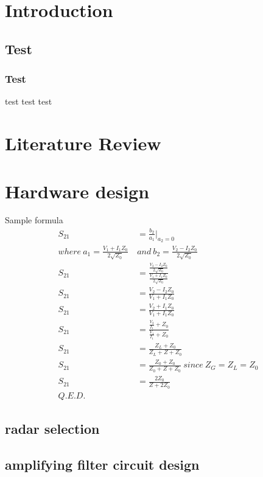 \thispagestyle{empty}
\newpage

\tableofcontents{\protect\thispagestyle{empty}}
\pagestyle{fancy}
\clearpage
\setcounter{page}{1}
\newpage



\section{Introduction}


\subsection{Test}
\subsubsection{Test}
test \textcite{dirac} test
test


\section{Literature Review}


\section{Hardware design}
Sample formula
\begin{align}
    S_{21}&=\frac{b_2}{a_1}|_{a_2=0}\\
    where\ a_1=\frac{V_1+I_1Z_0}{2\sqrt{Z_0}}\ &and\ b_2=\frac{V_2-I_2Z_0}{2\sqrt{Z_0}}\\
    S_{21}&=\frac{\frac{V_2-I_2Z_0}{2\sqrt{Z_0}}}{\frac{V_1+I_1Z_0}{2\sqrt{Z_0}}}\\
    S_{21}&=\frac{V_2-I_2Z_0}{V_1+I_1Z_0}\\
    S_{21}&=\frac{V_2+I_1Z_0}{V_1+I_1Z_0}\\
    S_{21}&=\frac{\frac{V_2}{I_1}+Z_0}{\frac{V_1}{{I_1}}+Z_0}\\
    S_{21}&=\frac{Z_L+Z_0}{Z_L+Z+Z_0}\\
    S_{21}&=\frac{Z_0+Z_0}{Z_0+Z+Z_0}\ since\ Z_G=Z_L=Z_0\\
    S_{21}&=\frac{2Z_0}{Z+2Z_0}\\
    Q.E.D.
\end{align}

\subsection{radar selection}
\subsection{amplifying filter circuit design}
